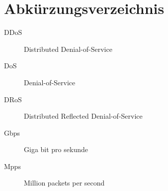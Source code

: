 \documentclass[../review_1.tex]{subfiles}
\begin{document}
\chapter{Abkürzungsverzeichnis}\thispagestyle{fancy}
\begin{description}
    \item[DDoS] Distributed Denial-of-Service
    \item[DoS] Denial-of-Service
    \item[DRoS] Distributed Reflected Denial-of-Service
    \item[Gbps] Giga bit pro sekunde
    \item[Mpps] Million packets per second
\end{description}
\end{document}
